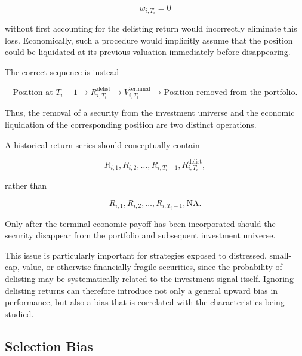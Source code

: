 \documentclass[11pt,a4paper]{article}
\begin{document}
\begin{equation}
w_{i,T_i}=0
\end{equation}

without first accounting for the delisting return would incorrectly eliminate
this loss. Economically, such a procedure would implicitly assume that the
position could be liquidated at its previous valuation immediately before
disappearing.

The correct sequence is instead

\begin{equation}
\boxed{
\text{Position at }T_i-1
\rightarrow
R_{i,T_i}^{\mathrm{delist}}
\rightarrow
V_{i,T_i}^{\mathrm{terminal}}
\rightarrow
\text{Position removed from the portfolio}.
}
\end{equation}

Thus, the removal of a security from the investment universe and the economic
liquidation of the corresponding position are two distinct operations.

A historical return series should conceptually contain

\begin{equation}
\boxed{
R_{i,1},
R_{i,2},
\ldots,
R_{i,T_i-1},
R_{i,T_i}^{\mathrm{delist}},
}
\end{equation}

rather than

\begin{equation}
R_{i,1},
R_{i,2},
\ldots,
R_{i,T_i-1},
\mathrm{NA}.
\end{equation}

Only after the terminal economic payoff has been incorporated should the
security disappear from the portfolio and subsequent investment universe.

This issue is particularly important for strategies exposed to distressed,
small-cap, value, or otherwise financially fragile securities, since the
probability of delisting may be systematically related to the investment
signal itself. Ignoring delisting returns can therefore introduce not only a
general upward bias in performance, but also a bias that is correlated with
the characteristics being studied.


\subsection{Selection Bias}
\label{subsec:selection_bias}
\end{document}
